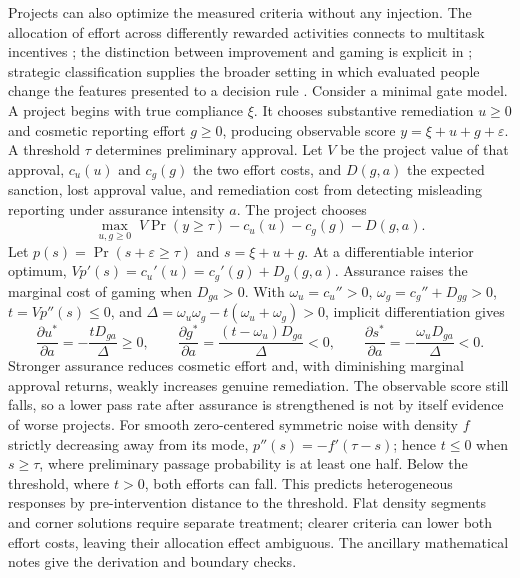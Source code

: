 Projects can also optimize the measured criteria without any injection. The allocation of effort across
differently rewarded activities connects to multitask incentives \citep{holmstrom1991}; the distinction
between improvement and gaming is explicit in \citet{kleinberg2019}; strategic classification supplies
the broader setting in which evaluated people change the features presented to a decision rule
\citep{hardt2016}. Consider a minimal gate model. A project begins with true compliance $\xi$. It
chooses substantive remediation $u\ge 0$ and cosmetic reporting effort $g\ge 0$, producing observable
score $y=\xi+u+g+\varepsilon$. A threshold $\tau$ determines preliminary approval. Let $V$ be the
project value of that approval, $c_u(u)$ and $c_g(g)$ the two effort costs, and $D(g,a)$ the expected
sanction, lost approval value, and remediation cost from detecting misleading reporting under assurance
intensity $a$. The project chooses
\begin{equation}
\max_{u,g\ge 0}\; V\Pr(y\ge\tau)-c_u(u)-c_g(g)-D(g,a). \label{eq:strategic}
\end{equation}
Let $p(s)=\Pr(s+\varepsilon\ge\tau)$ and $s=\xi+u+g$. At a differentiable interior optimum,
$Vp'(s)=c_u'(u)=c_g'(g)+D_g(g,a)$. Assurance raises the marginal cost of gaming when $D_{ga}>0$. With
$\omega_u=c_u''>0$, $\omega_g=c_g''+D_{gg}>0$, $t=Vp''(s)\le 0$, and
$\Delta=\omega_u\omega_g-t(\omega_u+\omega_g)>0$, implicit differentiation gives
\begin{equation}
\frac{\partial u^{*}}{\partial a}=-\frac{tD_{ga}}{\Delta}\ge 0,\qquad
\frac{\partial g^{*}}{\partial a}=\frac{(t-\omega_u)D_{ga}}{\Delta}<0,\qquad
\frac{\partial s^{*}}{\partial a}=-\frac{\omega_uD_{ga}}{\Delta}<0 . \label{eq:statics}
\end{equation}
Stronger assurance reduces cosmetic effort and, with diminishing marginal approval returns, weakly
increases genuine remediation. The observable score still falls, so a lower pass rate after assurance
is strengthened is not by itself evidence of worse projects. For smooth zero-centered symmetric noise
with density $f$ strictly decreasing away from its mode, $p''(s)=-f'(\tau-s)$; hence $t\le 0$ when
$s\ge\tau$, where preliminary passage probability is at least one half. Below the threshold, where
$t>0$, both efforts can fall. This predicts heterogeneous responses by pre-intervention distance to the
threshold. Flat density segments and corner solutions require separate treatment; clearer criteria can
lower both effort costs, leaving their allocation effect ambiguous. The ancillary mathematical notes
give the derivation and boundary checks.


